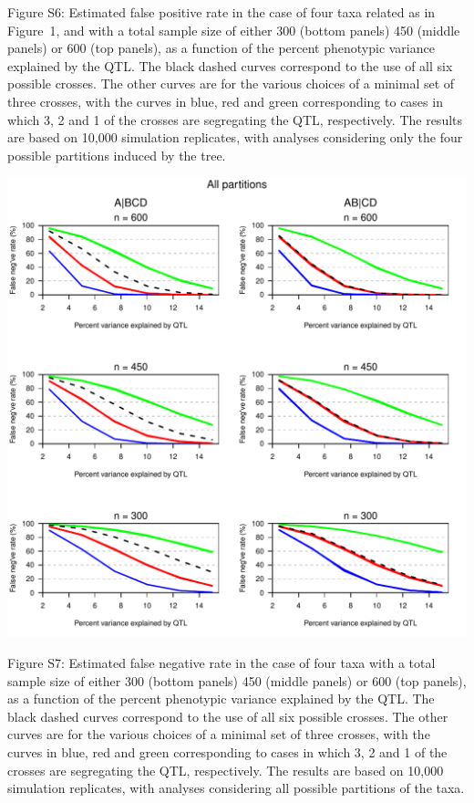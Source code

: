 \documentclass[letterpaper,twoside]{article}
\begin{document}
\bigskip \noindent
Figure S6: Estimated false positive rate in the case of four taxa related as in
  Figure~1, and with a total sample size of either 300 (bottom panels)
  450 (middle panels) or 600 (top panels), as a function of the
  percent phenotypic variance explained by the QTL.  The black dashed
  curves correspond to the use of all six possible crosses.  The other
  curves are for the various choices of a minimal set of three
  crosses, with the curves in blue, red and green corresponding to
  cases in which 3, 2 and 1 of the crosses are segregating the QTL,
  respectively.  The results are based on 10,000 simulation
  replicates, with analyses considering only the four possible
  partitions induced by the tree.

\newpage

{\centering
\includegraphics{SuppFigs/ns_allpart.pdf}}

\bigskip \noindent
Figure S7: Estimated false negative rate in the case of four taxa with a total
  sample size of either 300 (bottom panels) 450 (middle panels) or 600
  (top panels), as a function of the percent phenotypic variance
  explained by the QTL.  The black dashed curves correspond to the use
  of all six possible crosses.  The other curves are for the various
  choices of a minimal set of three crosses, with the curves in blue,
  red and green corresponding to cases in which 3, 2 and 1 of the
  crosses are segregating the QTL, respectively.  The results are
  based on 10,000 simulation replicates, with analyses considering all
  possible partitions of the taxa.
\end{document}
